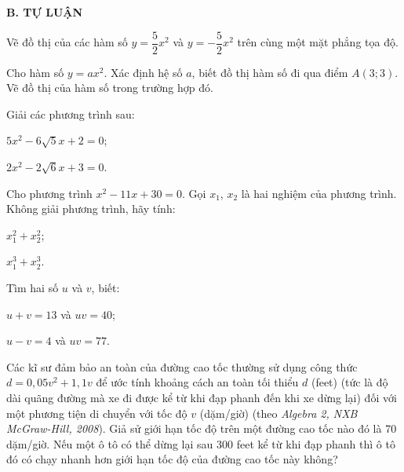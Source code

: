 \begin{exercises}
    \textbf{B. TỰ LUẬN}

    \begin{questions}[resume=SGK]
        \item Vẽ đồ thị của các hàm số $y=\dfrac{5}{2}x^2$ và $y=-\dfrac{5}{2}x^2$ trên cùng một mặt phẳng tọa độ.

        \answerline
        \answerline
        \answerline

        \item Cho hàm số $y=ax^2$. Xác định hệ số $a$, biết đồ thị hàm số đi qua điểm $A(3;3)$. Vẽ đồ thị của hàm số trong trường hợp đó.

        \answerline
        \answerline
        \answerline

        \item Giải các phương trình sau:
        \begin{questions}
            \item $5x^2-6\sqrt{5}x+2=0$;
            \item $2x^2-2\sqrt{6}x+3=0$.
        \end{questions}

        \answerline
        \answerline
        \answerline

        \item Cho phương trình $x^2-11x+30=0$. Gọi $x_1$, $x_2$ là hai nghiệm của phương trình. Không giải phương trình, hãy tính:
        \begin{questions}
            \item $x_1^2+x_2^2$;
            \item $x_1^3+x_2^3$.
        \end{questions}

        \answerline
        \answerline
        \answerline

        \item Tìm hai số $u$ và $v$, biết:
        \begin{questions}
            \item $u+v=13$ và $uv=40$;
            \item $u-v=4$ và $uv=77$.
        \end{questions}

        \answerline
        \answerline
        \answerline

        \item Các kĩ sư đảm bảo an toàn của đường cao tốc thường sử dụng công thức $d=0{,}05v^2+1{,}1v$ để ước tính khoảng cách an toàn tối thiểu $d$ (feet) (tức là độ dài quãng đường mà xe đi được kể từ khi đạp phanh đến khi xe dừng lại) đối với một phương tiện di chuyển với tốc độ $v$ (dặm/giờ) (theo \textit{Algebra 2, NXB McGraw-Hill, 2008}). Giả sử giới hạn tốc độ trên một đường cao tốc nào đó là 70 dặm/giờ. Nếu một ô tô có thể dừng lại sau 300 feet kể từ khi đạp phanh thì ô tô đó có chạy nhanh hơn giới hạn tốc độ của đường cao tốc này không?


\end{questions}
\end{exercises}
